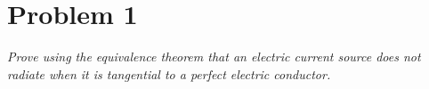 \section{Problem 1}
\textit{Prove using the equivalence theorem that an electric current source does not radiate when it 
is tangential to a perfect electric conductor.}\\

